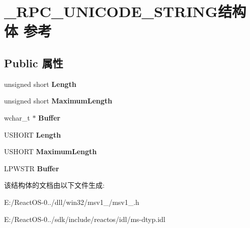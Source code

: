 \hypertarget{struct___r_p_c___u_n_i_c_o_d_e___s_t_r_i_n_g}{}\section{\+\_\+\+R\+P\+C\+\_\+\+U\+N\+I\+C\+O\+D\+E\+\_\+\+S\+T\+R\+I\+N\+G结构体 参考}
\label{struct___r_p_c___u_n_i_c_o_d_e___s_t_r_i_n_g}
\subsection*{Public 属性}
\begin{DoxyCompactItemize}
\item 
\mbox{\label{struct___r_p_c___u_n_i_c_o_d_e___s_t_r_i_n_g_a11a4d1004b8479bf8a18e022af7b1429}} 
unsigned short {\bfseries Length}
\item 
\mbox{\label{struct___r_p_c___u_n_i_c_o_d_e___s_t_r_i_n_g_aa0c67bc23189c6ed291d5ea9441ad6d7}} 
unsigned short {\bfseries Maximum\+Length}
\item 
\mbox{\label{struct___r_p_c___u_n_i_c_o_d_e___s_t_r_i_n_g_ad291bf214408ad6949b2829d584fbf83}} 
wchar\+\_\+t $\ast$ {\bfseries Buffer}
\item 
\mbox{\label{struct___r_p_c___u_n_i_c_o_d_e___s_t_r_i_n_g_a72bfd2d2ea9c628d23f26a1111a37752}} 
U\+S\+H\+O\+RT {\bfseries Length}
\item 
\mbox{\label{struct___r_p_c___u_n_i_c_o_d_e___s_t_r_i_n_g_a9efa150b1ca6cf36f2b64e5412560421}} 
U\+S\+H\+O\+RT {\bfseries Maximum\+Length}
\item 
\mbox{\label{struct___r_p_c___u_n_i_c_o_d_e___s_t_r_i_n_g_aa696a04eea3f91472749366b519e806b}} 
L\+P\+W\+S\+TR {\bfseries Buffer}
\end{DoxyCompactItemize}


该结构体的文档由以下文件生成\+:\begin{DoxyCompactItemize}
\item 
E\+:/\+React\+O\+S-\/0../dll/win32/msv1\+\_/msv1\+\_.\+h\item 
E\+:/\+React\+O\+S-\/0../sdk/include/reactos/idl/ms-\/dtyp.\+idl\end{DoxyCompactItemize}
